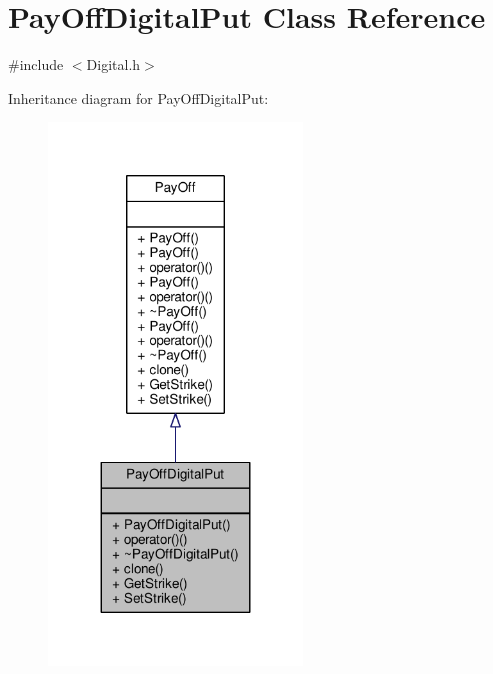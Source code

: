 \hypertarget{classPayOffDigitalPut}{}\section{Pay\+Off\+Digital\+Put Class Reference}
\label{classPayOffDigitalPut}


{\ttfamily \#include $<$Digital.\+h$>$}



Inheritance diagram for Pay\+Off\+Digital\+Put\+:
\nopagebreak
\begin{figure}[H]
\begin{center}
\leavevmode
\includegraphics[width=191pt]{classPayOffDigitalPut__inherit__graph}
\end{center}
\end{figure}


